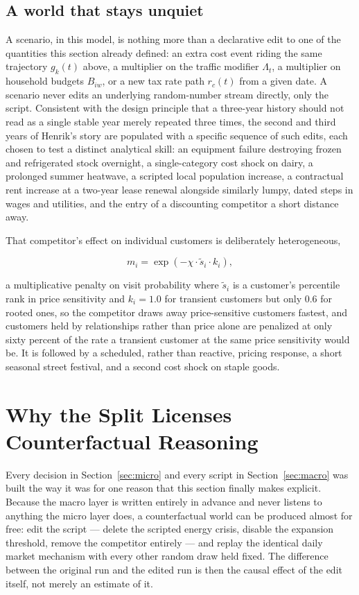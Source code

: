 \documentclass[12pt,a4paper]{article}
\begin{document}
\subsection{A world that stays unquiet}

A scenario, in this model, is nothing more than a declarative edit to
one of the quantities this section already defined: an extra cost event
riding the same trajectory $g_k(t)$ above, a multiplier on the traffic
modifier $\Lambda_t$, a multiplier on household budgets $B_{iw}$, or a
new tax rate path $r_c(t)$ from a given date. A scenario never edits an
underlying random-number stream directly, only the script. Consistent
with the design principle that a three-year history should not read as
a single stable year merely repeated three times, the second and third
years of Henrik's story are populated with a specific sequence of such
edits, each chosen to test a distinct analytical skill: an equipment
failure destroying frozen and refrigerated stock overnight, a
single-category cost shock on dairy, a prolonged summer heatwave, a
scripted local population increase, a contractual rent increase at a
two-year lease renewal alongside similarly lumpy, dated steps in wages
and utilities, and the entry of a discounting competitor a short
distance away.

That competitor's effect on individual customers is deliberately
heterogeneous,

\[
m_i = \exp(-\chi\cdot\tilde{s}_i\cdot k_i) ,
\]

a multiplicative penalty on visit probability where $\tilde{s}_i$ is a
customer's percentile rank in price sensitivity and $k_i = 1.0$ for
transient customers but only $0.6$ for rooted ones, so the competitor
draws away price-sensitive customers fastest, and customers held by
relationships rather than price alone are penalized at only sixty
percent of the rate a transient customer at the same price sensitivity
would be. It is followed by a scheduled, rather than reactive, pricing
response, a short seasonal street festival, and a second cost shock on
staple goods.

\section{Why the Split Licenses Counterfactual Reasoning}
\label{sec:counterfactual}

Every decision in Section~\ref{sec:micro} and every script in
Section~\ref{sec:macro} was built the way it was for one reason that
this section finally makes explicit. Because the macro layer is written
entirely in advance and never listens to anything the micro layer does,
a counterfactual world can be produced almost for free: edit the script
--- delete the scripted energy crisis, disable the expansion threshold,
remove the competitor entirely --- and replay the identical daily market
mechanism with every other random draw held fixed. The difference
between the original run and the edited run is then the causal effect
of the edit itself, not merely an estimate of it.
\end{document}
